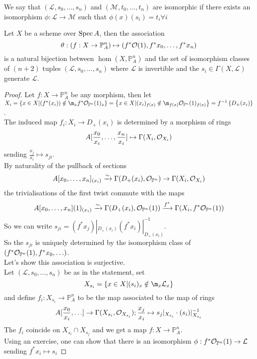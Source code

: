 \documentclass[../main.tex]{subfiles}
\begin{document}
We say that $ ( \mathcal{L}, s_0,\ldots,s_n) $ and $ ( \mathcal{M},t_0,\ldots,t_n) $ are isomorphic if there exists an isomorphism $\phi: \mathcal{L}\to \mathcal{M}$ such that $\phi( x) ( s_i) = t_i \forall i$ 
\begin{thm}
	Let $X$  be a scheme over $\operatorname{Spec} A$, then the association
	\[ 
	\theta: ( f:X\to \mathbb{P}^{n}_A) \mapsto ( f^{\ast}\mathcal{O}( 1) ,f^{\ast}x_0,\ldots,f^{\ast}x_n) 
	\]
	is a natural bijection between $\hom( X, \mathbb{P}^{n}_A) $ and the set of isomorphism classes of $( n+2) $ tuples $ ( \mathcal{L},s_0,\ldots,s_n) $ where $ \mathcal{L}$ is invertible and the $s_i\in \Gamma( X, \mathcal{L}) $ generate $ \mathcal{L}$.
\end{thm}
\begin{proof}
Let $f:X\to \mathbb{P}^{n}_A$ be any morphism, then let $X_i = \left\{ x\in X| ( f^{\ast}( x_i) ) \notin \m_x f^{\ast}\O_{\mathbb{P}^{n}} ( 1)_x \right\} = \left\{ x\in X| ( x_i)_{f( x) } \notin \m_{f( x) } \O_{\mathbb{P}^{n}} ( 1)_{f( x) } 	 \right\} = f^{-1}\left\{ D_+( x_i) \right\}  $.\\
The induced map $f_i : X_i \to D_+( x_i) $ is determined by a morphism of rings 
\[ 
	A[ \frac{x_0}{x_i},\ldots, \frac{x_n}{x_i}] \mapsto \Gamma( X_i,\mathcal{O}_{X_i} ) 
\]
sending $\frac{x_j}{x_i} \mapsto s_{ji} $.\\
By naturality of the pullback of sections
\[ 
	A[x_0,\ldots,x_n]_{( x_i) } \xrightarrow{\sim} \Gamma( D_+( x_i) ,\mathcal{O}_{\mathbb{P}^{n}} ) \to \Gamma( X_i, \mathcal{O}_{X_i} ) 
\]
the trivialisations of the first twist commute with the maps
\[ 
	A[x_0,\ldots,x_n] ( 1) _{( x_i) } \xrightarrow{\sim} \Gamma( D_+( x_i) ,\mathcal{O}_{\mathbb{P}^{n}} ( 1) ) \xrightarrow{f^{\ast}} \Gamma( X_i, f^{\ast}\mathcal{O}_{ \mathbb{P}^{n}}( 1)  ) 
\]
So we can write $ s_{ji} = ( f^{\ast}x_j) |_{D_+( x_i) } ( f^{\ast}x_i) |_{D_+( x_i) }^{-1}$.\\
So the $s_{ji} $ is uniquely determined by the isomorphism class of $ ( f^{\ast}\mathcal{O}_{\mathbb{P}^{n}}( 1) , f^{\ast}x_0,\ldots) $.\\
Let's show this association is surjective.\\
Let $ ( \mathcal{L}, s_0,\ldots,s_n) $ be as in the statement, set
\[ 
X_{s_i} = \left\{ x\in X|( s_i)_x \notin \m_x \mathcal{L}_x \right\} 
\]
and define $f_i :X_{s_i}\to \mathbb{P}^{n}_A $ to be the map associated to the map of rings
\[ 
	A[\frac{x_0}{x_i},\ldots] \to \Gamma( X_{s_i} , \mathcal{O}_{X_{s_i} } ) ; \frac{x_j}{x_i}\mapsto s_j|_{X_{s_i} } \cdot ( s_i) |_{X_{s_i} }^{-1}
\]
The $f_i$ coincide on $X_{s_i} \cap X_{s_j} $ and we get a map $f:X\to \mathbb{P}^{n}_A$.\\
Using an exercise, one can show that there is an isomorphism $\phi: f^{\ast}\mathcal{O}_{\mathbb{P}^{n}} ( 1)  \to \mathcal{L}$ sending $f^{\ast}x_i \mapsto s_i$
\end{proof}
\end{document}
